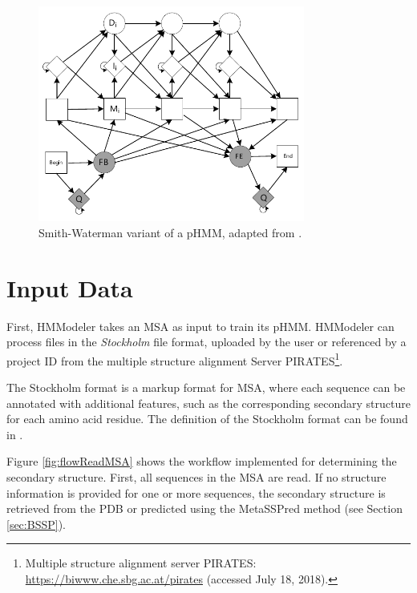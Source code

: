 \begin{figure}[H]
	\begin{center}
		\includegraphics[width=0.78\textwidth]{fig/pHMMsw}
	\end{center}
	\caption[Smith-Waterman variant of a \acs{pHMM}.]{Smith-Waterman variant of a \acs{pHMM}, adapted from \cite{Durbin.1998}.}
	\label{fig:pHHMsw}
\end{figure}

\section{Input Data}
\label{sec:inputData}

First, HMModeler takes an \ac{MSA} as input to train its \ac{pHMM}. HMModeler can process files in the \textit{Stockholm} file format, uploaded by the user or referenced by a project ID from the multiple structure alignment Server PIRATES\footnote{Multiple structure alignment server PIRATES: \url{https://biwww.che.sbg.ac.at/pirates} (accessed July 18, 2018).}. 

The Stockholm format is a markup format for \ac{MSA}, where each sequence can be annotated with additional features, such as the corresponding secondary structure for each amino acid residue. The definition of the Stockholm format can be found in \cite{Sonnhammer.xxx}. 

Figure \ref{fig:flowReadMSA} shows the workflow implemented for determining the secondary structure. First, all sequences in the \ac{MSA} are read. 
If no structure information is provided for one or more sequences, the secondary structure is retrieved from the \ac{PDB} or predicted using the MetaSSPred method (see Section \ref{sec:BSSP}).

